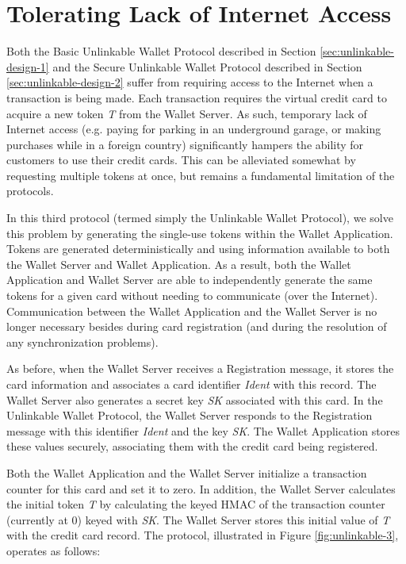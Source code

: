 \section{Tolerating Lack of Internet Access}
\label{sec:unlinkable-design-3}

Both the Basic Unlinkable Wallet Protocol described in Section \ref{sec:unlinkable-design-1}
    and the Secure Unlinkable Wallet Protocol described in Section \ref{sec:unlinkable-design-2}
    suffer from requiring access to the Internet when a transaction is being made.
Each transaction requires the virtual credit card to acquire a new token \emph{T} from the Wallet Server.
As such, temporary lack of Internet access
    (e.g. paying for parking in an underground garage, or making purchases while in a foreign country)
    significantly hampers the ability for customers to use their credit cards.
This can be alleviated somewhat by requesting multiple tokens at once, but remains a fundamental limitation of the protocols.

In this third protocol (termed simply the Unlinkable Wallet Protocol), we solve this problem by generating the single-use tokens within the Wallet Application.
Tokens are generated deterministically and using information available to both the Wallet Server and Wallet Application.
As a result, both the Wallet Application and Wallet Server are able to independently generate the same tokens for a given card without needing to communicate
    (over the Internet).
Communication between the Wallet Application and the Wallet Server is no longer necessary besides during card registration (and during the resolution of any synchronization problems).

As before, when the Wallet Server receives a Registration message, it stores the card information and associates a card identifier \emph{Ident} with this record.
The Wallet Server also generates a secret key \emph{SK} associated with this card.
In the Unlinkable Wallet Protocol, the Wallet Server responds to the Registration message with this identifier \emph{Ident} and the key \emph{SK}.
The Wallet Application stores these values securely, associating them with the credit card being registered.

Both the Wallet Application and the Wallet Server initialize a transaction counter for this card and set it to zero.
In addition, the Wallet Server calculates the initial token \emph{T} by calculating the keyed HMAC of the transaction counter (currently at 0) keyed with \emph{SK}.
The Wallet Server stores this initial value of \emph{T} with the credit card record.
The protocol, illustrated in Figure \ref{fig:unlinkable-3}, operates as follows:

